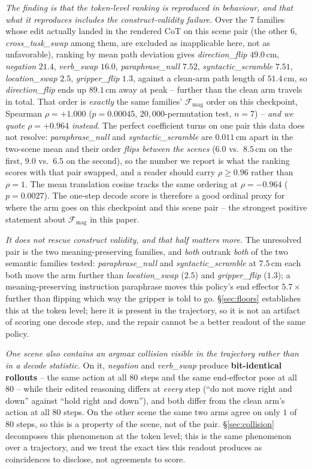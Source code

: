 \emph{The finding is that the token-level ranking is reproduced in behaviour, and that what it reproduces includes the construct-validity failure.} Over the $7$ families whose edit actually landed in the rendered CoT on this scene pair (the other $6$, \emph{cross\_task\_swap} among them, are excluded as inapplicable here, not as unfavorable), ranking by mean path deviation gives \emph{direction\_flip} $49.0$\,cm, \emph{negation} $21.4$, \emph{verb\_swap} $16.0$, \emph{paraphrase\_null} $7.52$, \emph{syntactic\_scramble} $7.51$, \emph{location\_swap} $2.5$, \emph{gripper\_flip} $1.3$, against a clean-arm path length of $51.4$\,cm, so \emph{direction\_flip} ends up $89.1$\,cm away at peak -- further than the clean arm travels in total. That order is \emph{exactly} the same families' $\mathcal{F}_{\text{mag}}$ order on this checkpoint, Spearman $\rho{=}+1.000$ ($p{=}0.00045$, $20{,}000$-permutation test, $n{=}7$) -- \emph{and we quote $\rho{=}+0.964$ instead}. The perfect coefficient turns on one pair this data does not resolve: \emph{paraphrase\_null} and \emph{syntactic\_scramble} are $0.011$\,cm apart in the two-scene mean and their order \emph{flips between the scenes} ($6.0$ vs.\ $8.5$\,cm on the first, $9.0$ vs.\ $6.5$ on the second), so the number we report is what the ranking scores with that pair swapped, and a reader should carry $\rho \geq 0.96$ rather than $\rho{=}1$. The mean translation cosine tracks the same ordering at $\rho{=}-0.964$ ($p{=}0.0027$). The one-step decode score is therefore a good ordinal proxy for where the arm goes on this checkpoint and this scene pair -- the strongest positive statement about $\mathcal{F}_{\text{mag}}$ in this paper.

\emph{It does not rescue construct validity, and that half matters more.} The unresolved pair is the two meaning-preserving families, and \emph{both} outrank \emph{both} of the two semantic families tested: \emph{paraphrase\_null} and \emph{syntactic\_scramble} at $7.5$\,cm each both move the arm further than \emph{location\_swap} ($2.5$) and \emph{gripper\_flip} ($1.3$); a meaning-preserving instruction paraphrase moves this policy's end effector $5.7\times$ further than flipping which way the gripper is told to go. \S\ref{sec:floors} establishes this at the token level; here it is present in the trajectory, so it is not an artifact of scoring one decode step, and the repair cannot be a better readout of the same policy.

\emph{One scene also contains an argmax collision visible in the trajectory rather than in a decode statistic.} On it, \emph{negation} and \emph{verb\_swap} produce \textbf{bit-identical rollouts} -- the same action at all $80$ steps and the same end-effector pose at all $80$ -- while their edited reasoning differs at \emph{every} step (``do not move right and down'' against ``hold right and down''), and both differ from the clean arm's action at all $80$ steps. On the other scene the same two arms agree on only $1$ of $80$ steps, so this is a property of the scene, not of the pair. \S\ref{sec:collision} decomposes this phenomenon at the token level; this is the same phenomenon over a trajectory, and we treat the exact ties this readout produces as coincidences to disclose, not agreements to score.

